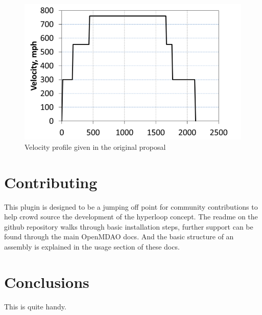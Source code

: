 \documentclass[heading.tex]{subfiles}
\begin{document}
\begin{figure}[hbtp]
\caption{Velocity profile given in the original proposal}
\centering
\includegraphics[scale=0.5]{images/velocity_profile.png}
\end{figure}

\section{Contributing}
This plugin is designed to be a jumping off point for community contributions to help crowd source the development of the hyperloop concept. The readme on the github repository walks through basic installation steps, further support can be found through the main OpenMDAO docs. And the basic structure of an assembly is explained in the usage section of these docs.

\section{Conclusions}
This is quite handy.

\end{document}
